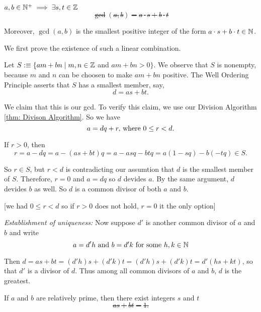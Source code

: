 \begin{thm}
  $a,b \in \mathbb{N}^+ \implies \exists s,t \in \mathbb{Z}$ \st
  \begin{equation}
    \gcd(a,b)=a\cdot s+b \cdot t
  \end{equation}

  Moreover, $\gcd(a,b)$ is the smallest positive integer  of the form $a\cdot s+b \cdot t \in \mathbb{N}$.
\end{thm}
\begin{prf}
  We first prove the existence of such a linear combination.

  Let $S :\equiv \{am + bn \mid m,n \in \mathbb{Z} $ and $am+bn >0 \}$. We observe that $S$ is nonempty, because $m$ and $n$ can be choosen to make $am + bn$ positive. The Well Ordering Principle asserts that $S$ has a smallest member, say,
  \begin{equation}
    d=as+bt.
  \end{equation}

  We claim that this is our gcd. To verify this claim, we use our Division Algorithm \ref{thm: Divison Algorithm}. So we have
  \begin{equation}
    a = dq + r, $ where $ 0 \leq r < d.
  \end{equation}

  If $r > 0$, then
  \begin{equation}
    r = a-dq = a-(as+bt)q=a-asq-btq=a(1-sq)-b(-tq)\in S.
  \end{equation}

  So $r\in S$, but $r<d$ is contradicting our assumtion that $d$ is the smallest member of $S$. Therefore, $r=0$ and $a=dq$ so $d$ devides $a$. By the same argument, $d$ devides $b$ as well. So $d$ is a common divisor of both $a$ and $b$.

  [we had $0 \leq r < d$ so if $r>0$ does not hold, $r=0$ it the only option]

  \bigbreak

  \emph{Establishment of uniqueness:} Now suppose $d'$ is another common divisor of $a$ and $b$ and write
  \begin{equation}
    a = d'h $ and $ b=d'k $ for some $ h,k \in \nat
  \end{equation}

  Then $d=as + bt = (d'h)s + (d'k)t = (d'h)s + (d'k)t = d'(hs + kt)$, so that $d'$ is a divisor of $d$. Thus among all common divisors of $a$ and $b$, $d$ is the greatest.
\end{prf}
\begin{corollary}
  If $a$ and $b$ are relatively prime, then there exist integers $s$ and $t$ \st
  \begin{equation}
    as + bt = 1.
  \end{equation}
\end{corollary}

